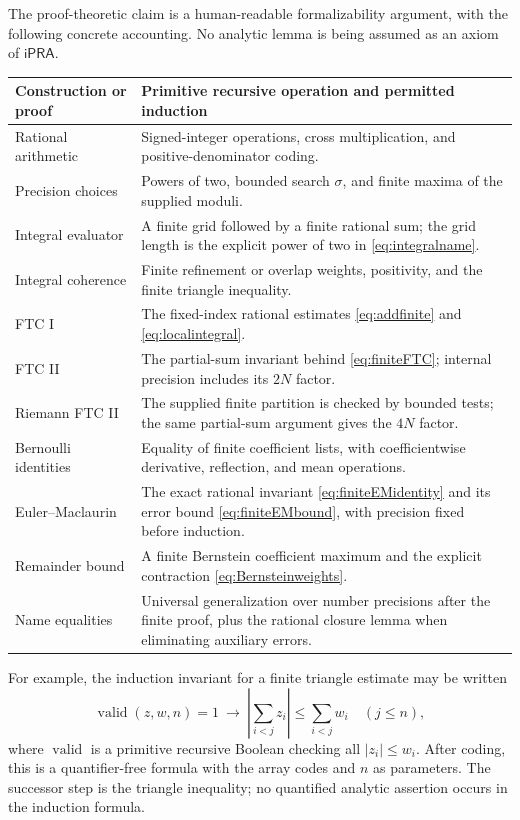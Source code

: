 \documentclass[11pt]{article}
\theoremstyle{definition}
\newcommand{\ipra}{\ensuremath{\mathsf{iPRA}}}
\newcommand{\abs}[1]{\left|#1\right|}
\begin{document}
The proof-theoretic claim is a human-readable formalizability argument,
with the following concrete accounting.  No analytic lemma is being
assumed as an axiom of \ipra.

\begin{longtable}{>{\raggedright\arraybackslash}p{}>{\raggedright\arraybackslash}p{}}
\toprule
Construction or proof & Primitive recursive operation and permitted induction\\\midrule
\endhead
Rational arithmetic & Signed-integer operations, cross multiplication,
and positive-denominator coding.\\
Precision choices & Powers of two, bounded search \(\sigma\), and finite
maxima of the supplied moduli.\\
Integral evaluator & A finite grid followed by a finite rational sum;
the grid length is the explicit power of two in
\eqref{eq:integralname}.\\
Integral coherence & Finite refinement or overlap weights, positivity,
and the finite triangle inequality.\\
FTC I & The fixed-index rational estimates
\eqref{eq:addfinite} and \eqref{eq:localintegral}.\\
FTC II & The partial-sum invariant behind
\eqref{eq:finiteFTC}; internal precision includes its \(2N\) factor.\\
Riemann FTC II & The supplied finite partition is checked by bounded
tests; the same partial-sum argument gives the \(4N\) factor.\\
Bernoulli identities & Equality of finite coefficient lists, with
coefficientwise derivative, reflection, and mean operations.\\
Euler--Maclaurin & The exact rational invariant
\eqref{eq:finiteEMidentity} and its error bound
\eqref{eq:finiteEMbound}, with precision fixed before induction.\\
Remainder bound & A finite Bernstein coefficient maximum and the
explicit contraction \eqref{eq:Bernsteinweights}.\\
Name equalities & Universal generalization over number precisions after
the finite proof, plus the rational closure lemma when eliminating
auxiliary errors.\\\bottomrule
\end{longtable}

For example, the induction invariant for a finite triangle estimate
may be written
\[
 \operatorname{valid}(z,w,n)=1\ \longrightarrow\
 \abs{\sum_{i<j}z_i}\le\sum_{i<j}w_i\quad(j\le n),
\]
where \(\operatorname{valid}\) is a primitive recursive Boolean
checking all \(\abs{z_i}\le w_i\).  After coding, this is a
quantifier-free formula with the array codes and \(n\) as parameters.
The successor step is the triangle inequality; no quantified analytic
assertion occurs in the induction formula.
\end{document}
